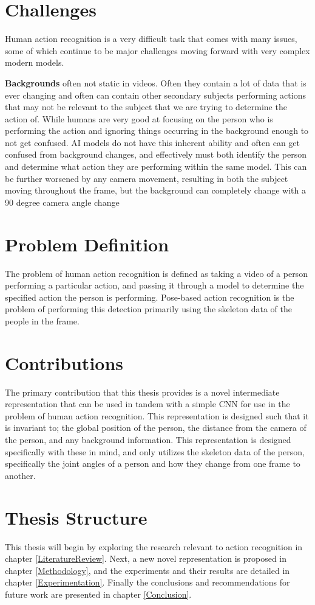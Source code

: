 \section{Challenges}
\label{sec:challenges}

Human action recognition is a very difficult task that comes with many issues, some of which continue to be major challenges moving forward with very complex modern models.

\textbf{Backgrounds} often not static in videos. Often they contain a lot of data that is ever changing and often can contain other secondary subjects performing actions that may not be relevant to the subject that we are trying to determine the action of. While humans are very good at focusing on the person who is performing the action and ignoring things occurring in the background enough to not get confused. AI models do not have this inherent ability and often can get confused from background changes, and effectively must both identify the person and determine what action they are performing within the same model. This can be further worsened by any camera movement, resulting in both the subject moving throughout the frame, but the background can completely change with a  90 degree camera angle change

\section{Problem Definition}

The problem of human action recognition is defined as taking a video of a person performing a particular action, and passing it through a model to determine the specified action the person is performing. Pose-based action recognition is the problem of performing this detection primarily using the skeleton data of the people in the frame.

\section{Contributions}

The primary contribution that this thesis provides is a novel intermediate representation that can be used in tandem with a simple CNN for use in the problem of human action recognition. This representation is designed such that it is invariant to; the global position of the person, the distance from the camera of the person, and any background information. This representation is designed specifically with these in mind, and only utilizes the skeleton data of the person, specifically the joint angles of a person and how they change from one frame to another.

\section{Thesis Structure}

This thesis will begin by exploring the research relevant to action recognition in chapter \ref{LiteratureReview}. Next, a new novel representation is proposed in chapter \ref{Methodology}, and the experiments and their results are detailed in chapter \ref{Experimentation}. Finally the conclusions and recommendations for future work are presented in chapter \ref{Conclusion}.
